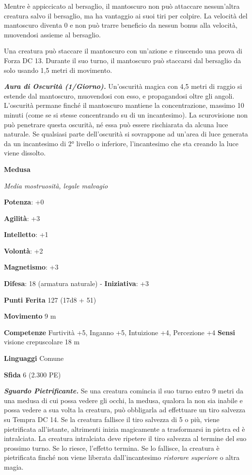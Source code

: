 \begin{multicols}{2}
Mentre è appiccicato al bersaglio, il mantoscuro non può attaccare
nessun'altra creatura salvo il bersaglio, ma ha vantaggio ai suoi tiri
per colpire. La velocità del mantoscuro diventa 0 e non può trarre
beneficio da nessun bonus alla velocità, muovendosi assieme al
bersaglio.

Una creatura può staccare il mantoscuro con un'azione e riuscendo una
prova di Forza DC 13. Durante il suo turno, il mantoscuro può staccarsi
dal bersaglio da solo usando 1,5 metri di movimento.

\emph{\textbf{Aura di Oscurità (1/Giorno).}} Un'oscurità magica con 4,5
metri di raggio si estende dal mantoscuro, muovendosi con esso, e
propagandosi oltre gli angoli. L'oscurità permane finché il mantoscuro
mantiene la concentrazione, massimo 10 minuti (come se si stesse
concentrando su di un incantesimo). La scurovisione non può penetrare
questa oscurità, né essa può essere rischiarata da alcuna luce naturale.
Se qualsiasi parte dell'oscurità si sovrappone ad un'area di luce
generata da un incantesimo di 2° livello o inferiore, l'incantesimo che
sta creando la luce viene dissolto.

\textbf{Medusa}

\emph{Media mostruosità, legale malvagio}

\textbf{Potenza}: +0

\textbf{Agilità}: +3

\textbf{Intelletto}: +1

\textbf{Volontà}: +2

\textbf{Magnetismo}: +3

\textbf{Difesa}: 18 (armatura naturale) - \textbf{Iniziativa}: +3

\textbf{Punti Ferita} 127 (17d8 + 51)

\textbf{Movimento} 9 m

\textbf{Competenze} Furtività +5, Inganno +5, Intuizione +4, Percezione +4
\textbf{Sensi} visione crepuscolare 18 m

\textbf{Linguaggi} Comune

\textbf{Sfida} 6 (2.300 PE)\smallskip

\emph{\textbf{Sguardo Pietrificante.}} Se una creatura comincia il suo
turno entro 9 metri da una medusa di cui possa vedere gli occhi, la
medusa, qualora la non sia inabile e possa vedere a sua volta la
creatura, può obbligarla ad effettuare un tiro salvezza su Tempra
DC 14. Se la creatura fallisce il tiro salvezza di 5 o più, viene
pietrificata all'istante, altrimenti inizia magicamente a trasformarsi
in pietra ed è intralciata. La creatura intralciata deve ripetere il
tiro salvezza al termine del suo prossimo turno. Se lo riesce, l'effetto
termina. Se lo fallisce, la creatura è pietrificata finché non viene
liberata dall'incantesimo \emph{ristorare superiore} o altra magia.


\end{multicols}
